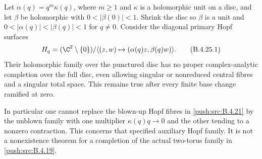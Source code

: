 
\begin{proposition}\label{push:src:B.4.25}
\label{push:B425}
Let $\alpha(q)=q^m\kappa(q)$, where $m\ge1$ and
$\kappa$ is a holomorphic unit on a disc, and let $\beta$
be holomorphic with $0<|\beta(0)|<1$. Shrink the disc so
$\beta$ is a unit and $0<|\alpha(q)|<|\beta(q)|<1$ for
$q\ne0$. Consider the diagonal primary Hopf surfaces
\[
 H_q=(\C^2\setminus\{0\})/
       \langle(z,w)\mapsto(\alpha(q)z,\beta(q)w)\rangle.
                                                        \tag{B.4.25.1}
\]
Their holomorphic family over the punctured disc has no
proper complex-analytic completion over the full disc,
even allowing singular or nonreduced central fibres and
a singular total space. This remains true after every
finite base change ramified at zero.

In particular one cannot replace the blown-up Hopf
fibres in \ref{push:src:B.4.21} by the unblown family with one multiplier
$\kappa(q)q\to0$ and the other tending to a nonzero
contraction. This concerns that specified auxiliary
Hopf family. It is not a nonexistence theorem for a
completion of the actual two-torus family in \ref{push:src:B.4.19}.
\end{proposition}

